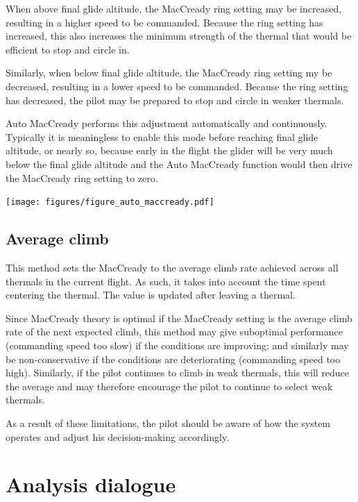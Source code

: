 When above final glide altitude, the MacCready ring setting may be
increased, resulting in a higher speed to be commanded.  Because the
ring setting has increased, this also increases the minimum strength
of the thermal that would be efficient to stop and circle in.

Similarly, when below final glide altitude, the MacCready ring setting
my be decreased, resulting in a lower speed to be commanded.  Because
the ring setting has decreased, the pilot may be prepared to stop and
circle in weaker thermals.

Auto MacCready performs this adjustment automatically and
continuously.  Typically it is meaningless to enable this mode before
reaching final glide altitude, or nearly so, because early in the
flight the glider will be very much below the final glide altitude and
the Auto MacCready function would then drive the MacCready ring
setting to zero.

\begin{maxipage}
\begin{center}
\texttt{[image: figures/figure\_auto\_maccready.pdf]}
\end{center}
\end{maxipage}


\subsection*{Average climb}

This method sets the MacCready to the average climb rate achieved
across all thermals in the current flight.  As such, it takes into
account the time spent centering the thermal.  The value is updated
after leaving a thermal.

Since MacCready theory is optimal if the MacCready setting is the
average climb rate of the next expected climb, this method may give
suboptimal performance (commanding speed too slow) if the conditions
are improving; and similarly may be non-conservative if the conditions
are deteriorating (commanding speed too high).  Similarly, if the pilot
continues to climb in weak thermals, this will reduce the average
and may therefore encourage the pilot to continue to select weak thermals.

As a result of these limitations, the pilot should be aware of how the
system operates and adjust his decision-making accordingly.


\section{Analysis dialogue}

